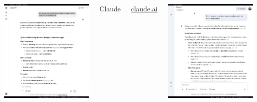 \documentclass[aspectratio=169]{beamer}
\begin{document}
\begin{frame}
\begin{columns}
        \centering
        \includegraphics[width=\textwidth]{figures/claude_screenshot.png}
        
        Claude
        
        \url{claude.ai}
        
        \centering
        \includegraphics[width=\textwidth]{figures/gemini_screenshot.png}
        

\end{columns}
\end{frame}
\end{document}
